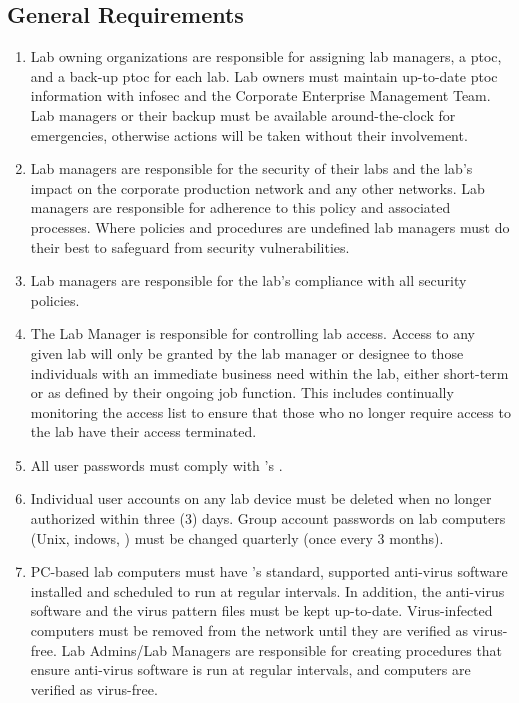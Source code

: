\subsection{General Requirements}
\begin{enumerate}
\item
Lab owning organizations are responsible for assigning lab managers, a \gls{ptoc}, and a back-up \gls{ptoc} for each lab.  
Lab owners must maintain up-to-date \gls{ptoc} information with \gls{infosec} and the Corporate Enterprise Management Team.  
Lab managers or their backup must be available around-the-clock for emergencies, otherwise actions will be taken without their involvement.
\item
Lab managers are responsible for the security of their labs and the lab's impact on the corporate production network and any other networks.  
Lab managers are responsible for adherence to this policy and associated processes.  
Where policies and procedures are undefined lab managers must do their best to safeguard \CompanyName{} from security vulnerabilities.
\item
Lab managers are responsible for the lab's compliance with all \CompanyName{} security policies. 
\item
The Lab Manager is responsible for controlling lab access.  
Access to any given lab will only be granted by the lab manager or designee\del{,} to those individuals with an immediate business need within the lab, either short-term or as defined by their ongoing job function.  
This includes continually monitoring the access list to ensure that those who no longer require access to the lab have their access terminated.
\item
All user passwords must comply with \CompanyName{}'s . 
\item
Individual user accounts on any lab device must be deleted when no longer authorized within three (3) days.  
Group account passwords on lab computers (Unix, indows, \etc) must be changed quarterly (once every 3 months). 
\item
PC-based lab computers must have \CompanyName{}'s standard, supported anti-virus software installed and scheduled to run at regular intervals.  
In addition, the anti-virus software and the virus pattern files must be kept up-to-date.  
Virus-infected computers must be removed from the network until they are verified as virus-free.  
Lab Admins/Lab Managers are responsible for creating procedures that ensure anti-virus software is run at regular intervals, and computers are verified as virus-free.

\end{enumerate}
